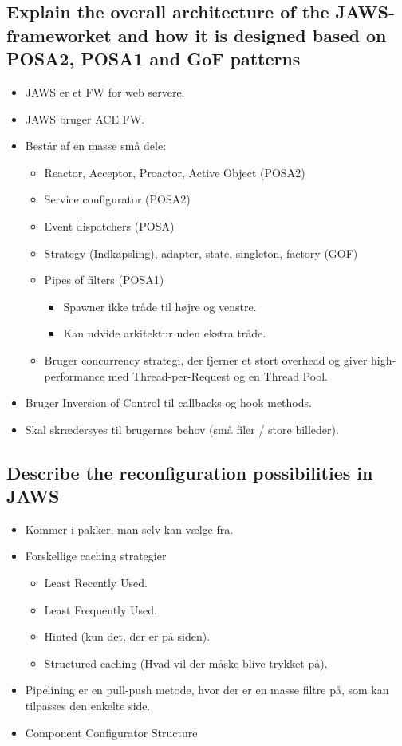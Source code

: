 \documentclass{article}
\begin{document}
\subsection{Explain the overall architecture of the JAWS-frameworket and how it is designed based on POSA2, POSA1 and GoF patterns}
\begin{itemize}
	\item JAWS er et FW for web servere.
	\item JAWS bruger ACE FW.
	\item Består af en masse små dele: 
	\begin{itemize}
		\item Reactor, Acceptor, Proactor, Active Object (POSA2)
		\item Service configurator (POSA2)
		\item Event dispatchers (POSA)
		\item Strategy (Indkapsling), adapter, state, singleton, factory (GOF)
		\item Pipes of filters (POSA1)
		\begin{itemize}
			\item Spawner ikke tråde til højre og venstre.
			\item Kan udvide arkitektur uden ekstra tråde.
		\end{itemize}
		\item Bruger concurrency strategi, der fjerner et stort overhead og giver high-performance med Thread-per-Request og en Thread Pool.
	\end{itemize}
	\item Bruger Inversion of Control til callbacks og hook methods.
	\item Skal skrædersyes til brugernes behov (små filer / store billeder).
\end{itemize}


\subsection{Describe the reconfiguration possibilities in JAWS}
\begin{itemize}
	\item Kommer i pakker, man selv kan vælge fra.
	\item Forskellige caching strategier
	\begin{itemize}
		\item Least Recently Used.
		\item Least Frequently Used.
		\item Hinted (kun det, der er på siden).
		\item Structured caching (Hvad vil der måske blive trykket på).
	\end{itemize}
	\item Pipelining er en pull-push metode, hvor der er en masse filtre på, som kan tilpasses den enkelte side.

	\item Component Configurator Structure
\end{itemize}
\end{document}
